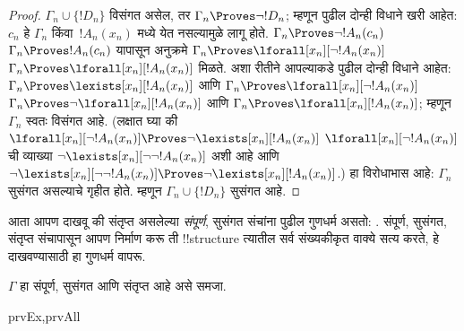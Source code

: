 \documentclass[../../../include/open-logic-section]{subfiles}
\begin{document}
\begin{proof}
$\Gamma_n \cup \{!D_n\}$ विसंगत असेल, तर $\Gamma_n
\Proves \lnot !D_n$; म्हणून पुढील दोन्ही विधाने खरी आहेत:
$c_n$ हे $\Gamma_n$ किंवा~$!A_n(x_n)$ मध्ये येत नसल्यामुळे
लागू होते.
{$\Gamma_n \Proves \lnot !A_n(c_n)$}
{$\Gamma_n \Proves !A_n(c_n)$}
यापासून अनुक्रमे
{$\Gamma_n \Proves \lforall[x_n][\lnot !A_n(x_n)]$}
{$\Gamma_n \Proves \lforall[x_n][!A_n(x_n)]$}
मिळते. अशा रीतीने आपल्याकडे पुढील दोन्ही विधाने आहेत:
{$\Gamma_n \Proves \lexists[x_n][!A_n(x_n)]$ आणि
$\Gamma_n \Proves \lforall[x_n][\lnot !A_n(x_n)]$}
{$\Gamma_n \Proves \lnot\lforall[x_n][!A_n(x_n)]$ आणि
$\Gamma_n \Proves \lforall[x_n][!A_n(x_n)]$};
म्हणून $\Gamma_n$ स्वतः विसंगत आहे.
{(लक्षात घ्या की
{$\lforall[x_n][\lnot !A_n(x_n)] \Proves
  \lnot\lexists[x_n][!A_n(x_n)]$}
{$\lforall[x_n][\lnot !A_n(x_n)]$ ची व्याख्या
  $\lnot\lexists[x_n][\lnot\lnot !A_n(x_n)]$ अशी आहे आणि
  $\lnot\lexists[x_n][\lnot\lnot !A_n(x_n)] \Proves
  \lnot\lexists[x_n][!A_n(x_n)]$}.)}{}
हा विरोधाभास आहे: $\Gamma_n$ सुसंगत असल्याचे गृहीत होते. म्हणून
$\Gamma_n \cup \{ !D_n\}$ सुसंगत आहे.
\end{proof}

\begin{explain}
आता आपण दाखवू की संतृप्त असलेल्या \emph{संपूर्ण}, सुसंगत संचांना पुढील
गुणधर्म असतो: . संपूर्ण, सुसंगत, संतृप्त संचापासून
आपण निर्माण करू ती !!{structure} त्यातील सर्व संख्यकीकृत वाक्ये सत्य करते,
हे दाखवण्यासाठी हा गुणधर्म वापरू.
\end{explain}

\begin{prop}
$\Gamma$ हा संपूर्ण, सुसंगत आणि संतृप्त आहे असे समजा.
\begin{tagenumerate}{prvEx,prvAll}
\end{tagenumerate}
\end{prop}
\end{document}

